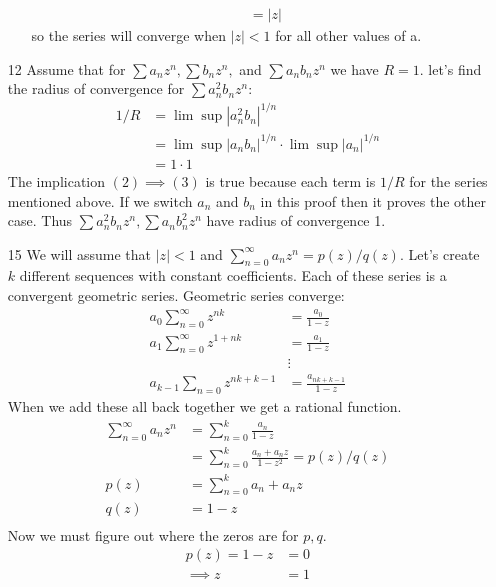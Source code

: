 \documentclass{article}
\begin{document}
\begin{enumerate}
\begin{enumerate}[label=(\roman*)]
\begin{align*}
            &=|z|
          \end{align*}
          so the series will converge when $|z|<1$ for all other values of a.
      \end{enumerate}
    \item[12]
      Assume that for $\sum a_nz^n,\sum b_nz^n,$ and $\sum a_nb_nz^n$ we have $R=1$. let's find the radius of convergence for $\sum a_n^2b_nz^n$:
      \begin{align}
        1/R&=\lim\sup|a_n^2b_n|^{1/n}\\
        &=\lim\sup|a_nb_n|^{1/n}\cdot\lim\sup|a_n|^{1/n}\\
        &=1\cdot1
      \end{align}
      The implication $(2)\implies(3)$ is true because each term is $1/R$ for the series mentioned above. If we switch $a_n$ and $b_n$ in this proof then it proves the other case. Thus $\sum a_n^2b_nz^n,\sum a_nb_n^2z^n$ have radius of convergence 1.
    \item[15]%
      We will assume that $|z|<1$ and $\sum_{n=0}^\infty a_nz^n=p(z)/q(z)$. Let's create $k$ different sequences with constant coefficients. Each of these series is a convergent geometric series. Geometric series converge:
      \begin{align*}
        a_0\sum_{n=0}^\infty z^{nk}&=\frac{a_0}{1-z}\\
        a_1\sum_{n=0}^\infty z^{1+nk}&=\frac{a_1}{1-z}\\
        &\vdots\\
        a_{k-1}\sum_{n=0}z^{nk+k-1}&=\frac{a_{nk+k-1}}{1-z}
      \end{align*}
      When we add these all back together we get a rational function.
      \begin{align*}
        \sum_{n=0}^\infty a_nz^n&=\sum_{n=0}^k\frac{a_n}{1-z}\\
        &=\sum_{n=0}^k\frac{a_n+a_nz}{1-z^2}=p(z)/q(z)\\
        p(z)&=\sum_{n=0}^k a_n+a_nz\tag{some constant}\\
        q(z)&=1-z\\
      \end{align*}
      Now we must figure out where the zeros are for $p,q$.
      \begin{align*}
        p(z)=1-z&=0\\
        \implies z&=1
      \end{align*}
      \begin{align*}

\end{align*}
\end{enumerate}
\end{document}
